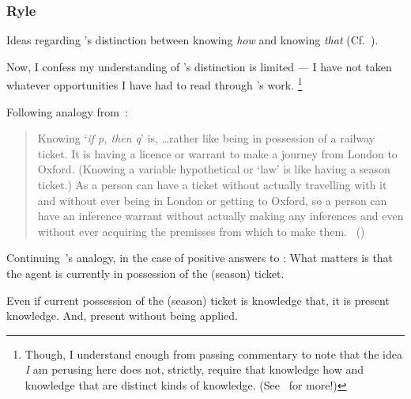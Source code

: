 \subsubsection{Ryle}

\begin{note}
  Ideas regarding \citeauthor{Ryle:1946tu}'s distinction between knowing \emph{how} and knowing \emph{that} (Cf.~\citeyear{Ryle:1946tu}).

  Now, I confess my understanding of \citeauthor{Ryle:1946tu}'s distinction is limited --- I have not taken whatever opportunities I have had to read through \citeauthor{Ryle:1946tu}'s work.%
  \footnote{
    Though, I understand enough from passing commentary to note that the idea \emph{I} am perusing here does not, strictly, require that knowledge how and knowledge that are distinct kinds of knowledge.
    (See~\textcite{Pavese:2022up} for more!)
  }

  Following analogy from~\textcite{Ryle:2009us}:

  \begin{quote}
    Knowing `\emph{if p, then q}' is, \dots rather like being in possession of a railway ticket.
    It is having a licence or warrant to make a journey from London to Oxford.
    (Knowing a variable hypothetical or `law' is like having a season ticket.)
    As a person can have a ticket without actually travelling with it and without ever being in London or getting to Oxford, so a person can have an inference warrant without actually making any inferences and even without ever acquiring the premisses from which to make them.%
    \mbox{ }\hfill\mbox{(\citeyear[250]{Ryle:2009us})}
  \end{quote}

  Continuing~\citeauthor{Ryle:2009us}'s analogy, in the case of positive answers to \qzS{}:
  What matters is that the agent is currently in possession of the (season) ticket.

  Even if current possession of the (season) ticket is knowledge that, it is present knowledge.
  And, present without being applied.
\end{note}


